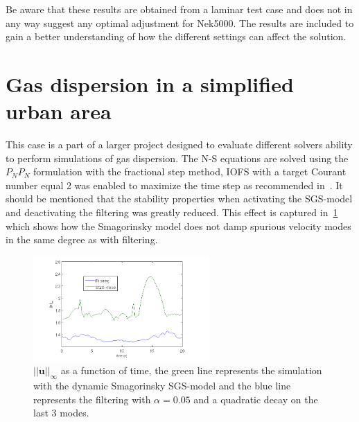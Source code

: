 Be aware that these results are obtained from a laminar test case and does not in any way 
suggest any optimal adjustment for Nek5000. The results are included to gain a better understanding
of how the different settings can affect the solution.

\section{Gas dispersion in a simplified urban area} 
This case is a part of a larger project designed to evaluate different solvers 
ability to perform simulations of gas dispersion. The N-S equations are solved using
the $P_NP_N$ formulation with the fractional step method, IOFS with a target Courant number 
equal 2 was enabled to maximize the time step as recommended in~\cite{Nek}. It should be 
mentioned that the stability properties when activating the SGS-model and deactivating the 
filtering was greatly reduced. This effect is captured in~\ref{fig:maxvel} which shows how 
the Smagorinsky model does not damp spurious velocity modes in the same degree as with filtering. 
%
\begin{figure}[h]
	\centering
	\includegraphics[width=0.6\textwidth]{Figures/maxvel.png}
    \caption{$||\mathbf{u}||_{\infty}$ as a function of time, the green line represents the 
simulation with the dynamic Smagorinsky SGS-model and the blue line represents the filtering 
with $\alpha = 0.05$ and a quadratic decay on the last 3 modes.}
	\label{fig:maxvel}
\end{figure}
%
%
%
%
%

